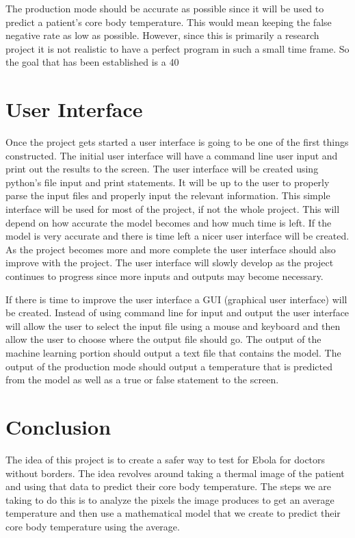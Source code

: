 ﻿\documentclass[onecolumn, draftclsnofoot,10pt, compsoc]{IEEEtran}
\begin{document}
The production mode should be accurate as possible since it will be used to predict a patient's core body temperature. This would mean keeping the false negative rate as low as possible. However, since this is primarily a research project it is not realistic to have a perfect program in such a small time frame. So the goal that has been established is a 40%

\section{User Interface}
Once the project gets started a user interface is going to be one of the first things constructed. The initial user interface will have a command line user input and print out the results to the screen. The user interface will be created using python's file input and print statements. It will be up to the user to properly parse the input files and properly input the relevant information. This simple interface will be used for most of the project, if not the whole project. This will depend on how accurate the model becomes and how much time is left. If the model is very accurate and there is time left a nicer user interface will be created. As the project becomes more and more complete the user interface should also improve with the project. The user interface will slowly develop as the project continues to progress since more inputs and outputs may become necessary.

If there is time to improve the user interface a GUI (graphical user interface) will be created. Instead of using command line for input and output the user interface will allow the user to select the input file using a mouse and keyboard and then allow the user to choose where the output file should go. The output of the machine learning portion should output a text file that contains the model. The output of the production mode should output a temperature that is predicted from the model as well as a true or false statement to the screen.

\section{Conclusion}
The idea of this project is to create a safer way to test for Ebola for doctors without borders. The idea revolves around taking a thermal image of the patient and using that data to predict their core body temperature. The steps we are taking to do this is to analyze the pixels the image produces to get an average temperature and then use a mathematical model that we create to predict their core body temperature using the average.
\end{document}
